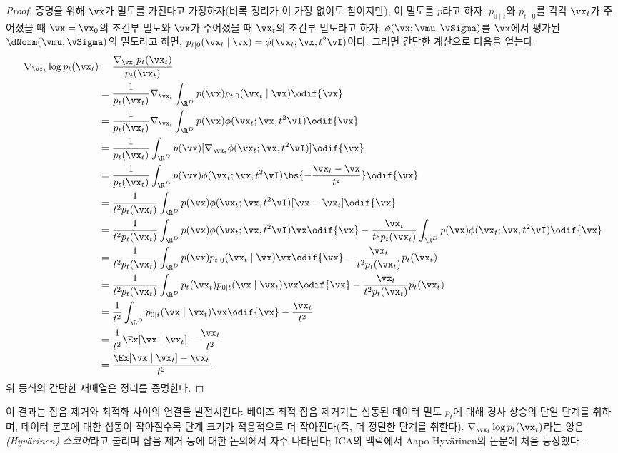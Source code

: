 \documentclass[../../book-main_ko.tex]{subfiles}
\begin{document}
\begin{proof}
	증명을 위해 \(\vx\)가 밀도를 가진다고 가정하자(비록 정리가 이 가정 없이도 참이지만), 이 밀도를 \(p\)라고 하자. \(p_{0 \mid t}\)와 \(p_{t \mid 0}\)를 각각 \(\vx_{t}\)가 주어졌을 때 \(\vx = \vx_{0}\)의 조건부 밀도와 \(\vx\)가 주어졌을 때 \(\vx_{t}\)의 조건부 밀도라고 하자. \(\phi(\vx ; \vmu, \vSigma)\)를 \(\vx\)에서 평가된 \(\dNorm(\vmu, \vSigma)\)의 밀도라고 하면, \(p_{t \mid 0}(\vx_{t} \mid \vx) = \phi(\vx_{t} ; \vx, t^{2}\vI)\)이다. 그러면 간단한 계산으로 다음을 얻는다
	\begin{align}
		\nabla_{\vx_{t}} \log p_{t}(\vx_{t})
		&= \frac{\nabla_{\vx_{t}}p_{t}(\vx_{t})}{p_{t}(\vx_{t})} \\
		&= \frac{1}{p_{t}(\vx_{t})}\nabla_{\vx_{t}}\int_{\R^{D}}p(\vx)p_{t \mid 0}(\vx_{t} \mid \vx)\odif{\vx} \\
		&=
		\frac{1}{p_{t}(\vx_{t})}\nabla_{\vx_{t}}\int_{\R^{D}}p(\vx)\phi(\vx_{t}
		;\vx, t^{2}\vI)\odif{\vx} \\
		&=
		\frac{1}{p_{t}(\vx_{t})}\int_{\R^{D}}p(\vx)[\nabla_{\vx_{t}}\phi(\vx_{t}
		;\vx, t^{2}\vI)]\odif{\vx} \\
		&= \frac{1}{p_{t}(\vx_{t})}\int_{\R^{D}}p(\vx)\phi(\vx_{t} ; \vx, t^{2}\vI)\bs{-\frac{\vx_{t} - \vx}{t^{2}}}\odif{\vx} \\
		&= \frac{1}{t^{2}p_{t}(\vx_{t})}\int_{\R^{D}}p(\vx)\phi(\vx_{t} ; \vx, t^{2}\vI)[\vx - \vx_{t}]\odif{\vx} \\
		&= \frac{1}{t^{2}p_{t}(\vx_{t})}\int_{\R^{D}}p(\vx)\phi(\vx_{t} ; \vx,
		t^{2}\vI)\vx \odif{\vx}
		- \frac{\vx_{t}}{t^{2}p_{t}(\vx_{t})}\int_{\R^{D}}p(\vx)\phi(\vx_{t} ; \vx, t^{2}\vI)\odif{\vx} \\
		&= \frac{1}{t^{2}p_{t}(\vx_{t})}\int_{\R^{D}}p(\vx)p_{t \mid 0}(\vx_{t} \mid \vx)\vx \odif{\vx} - \frac{\vx_{t}}{t^{2}p_{t}(\vx_{t})}p_{t}(\vx_{t}) \\
		&= \frac{1}{t^{2}p_{t}(\vx_{t})}\int_{\R^{D}}p_{t}(\vx_{t})p_{0 \mid t}(\vx \mid \vx_{t})\vx \odif{\vx} - \frac{\vx_{t}}{t^{2}p_{t}(\vx_{t})}p_{t}(\vx_{t}) \\
		&= \frac{1}{t^{2}}\int_{\R^{D}}p_{0 \mid t}(\vx \mid \vx_{t})\vx \odif{\vx} - \frac{\vx_{t}}{t^{2}} \\
		&= \frac{1}{t^{2}}\Ex[\vx \mid \vx_{t}] - \frac{\vx_{t}}{t^{2}} \\
		&= \frac{\Ex[\vx \mid \vx_{t}] - \vx_{t}}{t^{2}}.
	\end{align}
	위 등식의 간단한 재배열은 정리를 증명한다.
\end{proof}
이 결과는 잡음 제거와 최적화 사이의 연결을 발전시킨다: 베이즈 최적 잡음 제거기는 섭동된 데이터 밀도 \(p_{t}\)에 대해 경사 상승의 단일 단계를 취하며, 데이터 분포에 대한 섭동이 작아질수록 단계 크기가 적응적으로 더 작아진다(즉, 더 정밀한 단계를 취한다). \(\nabla_{\vx_{t}}\log p_{t}(\vx_{t})\)라는 양은 \textit{(Hyv\"arinen) 스코어}라고 불리며 잡음 제거 등에 대한 논의에서 자주 나타난다; ICA의 맥락에서 Aapo Hyv\"arinen의 논문에 처음 등장했다 \cite{hyvarinen05a}.
\end{document}
